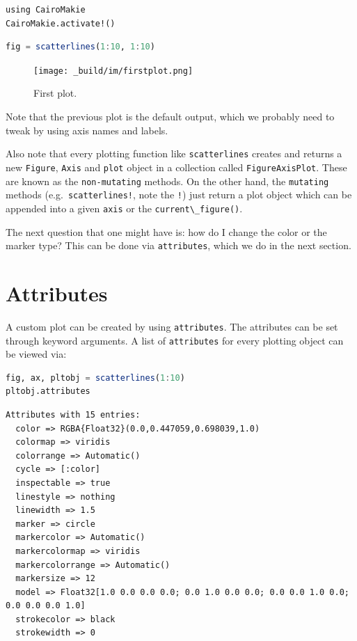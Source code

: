 \documentclass[
  notoc %
]{tufte-book}
\newcommand{\passthrough}[1]{#1}
\begin{document}
\begin{lstlisting}
using CairoMakie
CairoMakie.activate!()
\end{lstlisting}

\begin{lstlisting}[language=Julia]
fig = scatterlines(1:10, 1:10)
\end{lstlisting}

\begin{figure}
\hypertarget{fig:firstplot}{%
\centering
\texttt{[image: \_build/im/firstplot.png]}
\caption{First plot.}\label{fig:firstplot}
}
\end{figure}

Note that the previous plot is the default output, which we probably
need to tweak by using axis names and labels.

Also note that every plotting function like
\passthrough{\lstinline!scatterlines!} creates and returns a new
\passthrough{\lstinline!Figure!}, \passthrough{\lstinline!Axis!} and
\passthrough{\lstinline!plot!} object in a collection called
\passthrough{\lstinline!FigureAxisPlot!}. These are known as the
\passthrough{\lstinline!non-mutating!} methods. On the other hand, the
\passthrough{\lstinline!mutating!} methods
(e.g.~\passthrough{\lstinline"scatterlines!"}, note the
\passthrough{\lstinline"!"}) just return a plot object which can be
appended into a given \passthrough{\lstinline!axis!} or the
\passthrough{\lstinline!current\_figure()!}.

The next question that one might have is: how do I change the color or
the marker type? This can be done via
\passthrough{\lstinline!attributes!}, which we do in the next section.

\hypertarget{sec:datavisMakie_attributes}{%
\section{Attributes}\label{sec:datavisMakie_attributes}}

A custom plot can be created by using
\passthrough{\lstinline!attributes!}. The attributes can be set through
keyword arguments. A list of \passthrough{\lstinline!attributes!} for
every plotting object can be viewed via:

\begin{lstlisting}[language=Julia]
fig, ax, pltobj = scatterlines(1:10)
pltobj.attributes
\end{lstlisting}

\begin{lstlisting}[language=Output]
Attributes with 15 entries:
  color => RGBA{Float32}(0.0,0.447059,0.698039,1.0)
  colormap => viridis
  colorrange => Automatic()
  cycle => [:color]
  inspectable => true
  linestyle => nothing
  linewidth => 1.5
  marker => circle
  markercolor => Automatic()
  markercolormap => viridis
  markercolorrange => Automatic()
  markersize => 12
  model => Float32[1.0 0.0 0.0 0.0; 0.0 1.0 0.0 0.0; 0.0 0.0 1.0 0.0; 0.0 0.0 0.0 1.0]
  strokecolor => black
  strokewidth => 0
\end{lstlisting}
\end{document}
